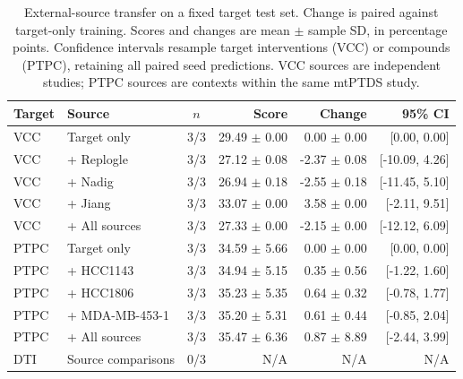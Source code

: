 \begin{table}[htbp]
\centering\small
\setlength{\tabcolsep}{4pt}
\begin{tabularx}{\linewidth}{@{}lXcrrr@{}}
\toprule
Target & Source & $n$ & Score & Change & 95\% CI \\
\midrule
VCC & Target only & 3/3 & 29.49 $\pm$ 0.00 & 0.00 $\pm$ 0.00 & [0.00, 0.00] \\
VCC & + Replogle & 3/3 & 27.12 $\pm$ 0.08 & -2.37 $\pm$ 0.08 & [-10.09, 4.26] \\
VCC & + Nadig & 3/3 & 26.94 $\pm$ 0.18 & -2.55 $\pm$ 0.18 & [-11.45, 5.10] \\
VCC & + Jiang & 3/3 & 33.07 $\pm$ 0.00 & 3.58 $\pm$ 0.00 & [-2.11, 9.51] \\
VCC & + All sources & 3/3 & 27.33 $\pm$ 0.00 & -2.15 $\pm$ 0.00 & [-12.12, 6.09] \\
\midrule
PTPC & Target only & 3/3 & 34.59 $\pm$ 5.66 & 0.00 $\pm$ 0.00 & [0.00, 0.00] \\
PTPC & + HCC1143 & 3/3 & 34.94 $\pm$ 5.15 & 0.35 $\pm$ 0.56 & [-1.22, 1.60] \\
PTPC & + HCC1806 & 3/3 & 35.23 $\pm$ 5.35 & 0.64 $\pm$ 0.32 & [-0.78, 1.77] \\
PTPC & + MDA-MB-453-1 & 3/3 & 35.20 $\pm$ 5.31 & 0.61 $\pm$ 0.44 & [-0.85, 2.04] \\
PTPC & + All sources & 3/3 & 35.47 $\pm$ 6.36 & 0.87 $\pm$ 8.89 & [-2.44, 3.99] \\
\midrule
DTI & Source comparisons & 0/3 & N/A & N/A & N/A \\
\bottomrule
\end{tabularx}
\caption{External-source transfer on a fixed target test set. Change is paired against target-only training. Scores and changes are mean $\pm$ sample SD, in percentage points. Confidence intervals resample target interventions (VCC) or compounds (PTPC), retaining all paired seed predictions. VCC sources are independent studies; PTPC sources are contexts within the same mtPTDS study.}
\label{tab:core-transfer}
\end{table}
